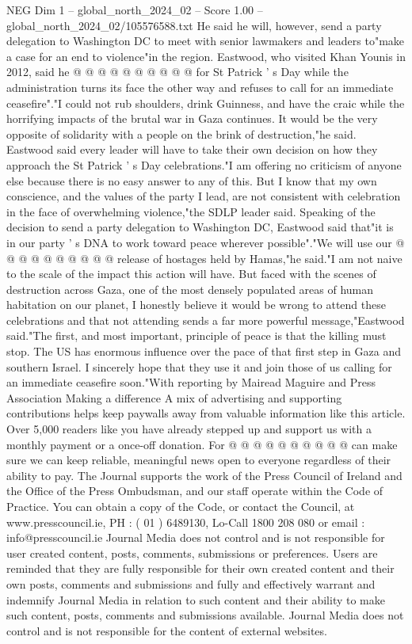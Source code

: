\begin{textsample}{NEG Dim 1 – global\_north\_2024\_02 – Score 1.00 – global\_north\_2024\_02/105576588.txt}
He said he will, however, send a party delegation to Washington DC to meet with senior lawmakers and leaders to"make a case for an end to violence"in the region.
Eastwood, who visited Khan Younis in 2012, said he @ @ @ @ @ @ @ @ @ @ for St Patrick ' s Day while the administration turns its face the other way and refuses to call for an immediate ceasefire"."I could not rub shoulders, drink Guinness, and have the craic while the horrifying impacts of the brutal war in Gaza continues.
It would be the very opposite of solidarity with a people on the brink of destruction,"he said.
Eastwood said every leader will have to take their own decision on how they approach the St Patrick ' s Day celebrations."I am offering no criticism of anyone else because there is no easy answer to any of this.
But I know that my own conscience, and the values of the party I lead, are not consistent with celebration in the face of overwhelming violence,"the SDLP leader said.
Speaking of the decision to send a party delegation to Washington DC, Eastwood said that"it is in our party ' s DNA to work toward peace wherever possible"."We will use our @ @ @ @ @ @ @ @ @ @ release of hostages held by Hamas,"he said."I am not naive to the scale of the impact this action will have.
But faced with the scenes of destruction across Gaza, one of the most densely populated areas of human habitation on our planet, I honestly believe it would be wrong to attend these celebrations and that not attending sends a far more powerful message,"Eastwood said."The first, and most important, principle of peace is that the killing must stop.
The US has enormous influence over the pace of that first step in Gaza and southern Israel.
I sincerely hope that they use it and join those of us calling for an immediate ceasefire soon."With reporting by Mairead Maguire and Press Association Making a difference A mix of advertising and supporting contributions helps keep paywalls away from valuable information like this article.
Over 5,000 readers like you have already stepped up and support us with a monthly payment or a once-off donation.
For @ @ @ @ @ @ @ @ @ @ can make sure we can keep reliable, meaningful news open to everyone regardless of their ability to pay.
The Journal supports the work of the Press Council of Ireland and the Office of the Press Ombudsman, and our staff operate within the Code of Practice.
You can obtain a copy of the Code, or contact the Council, at www.presscouncil.ie, PH : ( 01 ) 6489130, Lo-Call 1800 208 080 or email : info@presscouncil.ie Journal Media does not control and is not responsible for user created content, posts, comments, submissions or preferences.
Users are reminded that they are fully responsible for their own created content and their own posts, comments and submissions and fully and effectively warrant and indemnify Journal Media in relation to such content and their ability to make such content, posts, comments and submissions available.
Journal Media does not control and is not responsible for the content of external websites.

\end{textsample}
